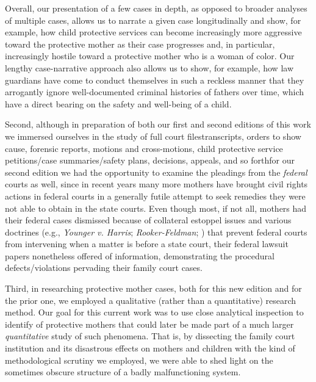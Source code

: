 Overall, our presentation of a few cases in depth, as opposed to
broader analyses of multiple cases, allows us to narrate a given 
case longitudinally and show, for example, how child protective services can
become increasingly more aggressive toward the protective mother as
their case progresses and, in particular, increasingly hostile toward a
protective mother who is a woman of color. Our lengthy case-narrative
approach also allows us to show, for example, how law guardians have
come to conduct themselves in such a reckless manner that they 
arrogantly ignore well-documented criminal histories of fathers over time,
which have a direct bearing on the safety and well-being of a child. \pfl{}

Second, although in preparation of both our first and second editions of this work we immersed ourselves in the study of full court
files\mdash{}transcripts, orders to show cause, forensic reports, motions and
cross-motions, child protective service petitions/case summaries/safety
plans, decisions, appeals, and so forth\mdash{}for our second edition we had
the opportunity to examine the pleadings from the \textit{federal} courts as
well, since in recent years many more mothers have brought civil
rights actions in federal courts in a generally futile attempt to seek remedies
they were not able to obtain in the state courts. Even though most, if
not all, mothers had their federal cases dismissed because of collateral estoppel issues and various  doctrines (e.g., \textit{Younger v. Harris};
\textit{Rooker-Feldman}; ) that prevent federal
courts from intervening when a matter is before a state court, their
federal lawsuit papers nonetheless offered  of information,
demonstrating the procedural defects/violations pervading their family
court cases. \pfl{}

Third, in researching protective mother cases, both for this new 
edition and for the prior one, we employed a qualitative (rather than a
quantitative) research method. Our goal for this current work was to
use close analytical inspection to identify  of
protective mothers that could later be made part of a much larger 
\textit{quantitative} study of such phenomena. That is, by dissecting the family court
institution and its disastrous effects on mothers and children with the
kind of methodological scrutiny we employed, we were able to shed light
on the sometimes obscure structure of a badly malfunctioning system. \pfl{}


